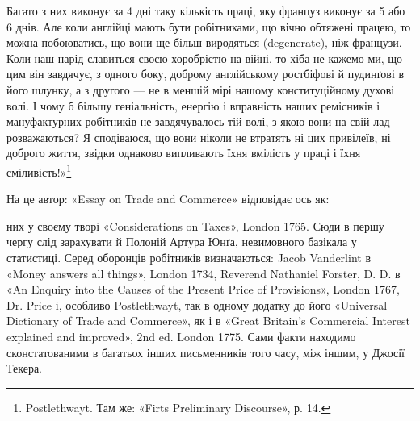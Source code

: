 Багато з них виконує за 4 дні таку кількість праці, яку француз
виконує за 5 або 6 днів. Але коли англійці мають бути робітниками,
що вічно обтяжені працею, то можна побоюватись, що вони
ще більш виродяться (degenerate), ніж французи. Коли наш нарід
славиться своєю хоробрістю на війні, то хіба не кажемо ми, що
цим він завдячує, з одного боку, доброму англійському ростбіфові
й пудинґові в його шлунку, а з другого — не в меншій мірі
нашому конституційному духові волі. І чому б більшу геніальність,
енергію і вправність наших ремісників і мануфактурних робітників
не завдячувалось тій волі, з якою вони на свій лад розважаються?
Я сподіваюся, що вони ніколи не втратять ні цих
привілеїв, ні доброго життя, звідки однаково випливають їхня
вмілість у праці і їхня сміливість!»\footnote{
Postlethwayt. Там же: «Firts Preliminary Discourse», р. 14.
}

На це автор: «Essay on Trade and Commerce» відповідає ось як:

них у своєму творі «Considerations on Taxes», London 1765. Сюди в
першу чергу слід зарахувати й Полоній Артура Юнґа, невимовного базікала
у статистиці. Серед оборонців робітників визначаються: Jacob Vanderlint
в «Money answers all things», London 1734, Reverend Nathaniel
Forster, D. D. в «An Enquiry into the Causes of the Present Price of Provisions»,
London 1767, Dr. Price і, особливо Postlethwayt, так в одному
додатку до його «Universal Dictionary of Trade and Commerce», як і в
«Great Britain’s Commercial Interest explained and improved», 2nd ed.
London 1775. Сами факти находимо сконстатованими в багатьох інших
письменників того часу, між іншим, у Джосії Текера.
